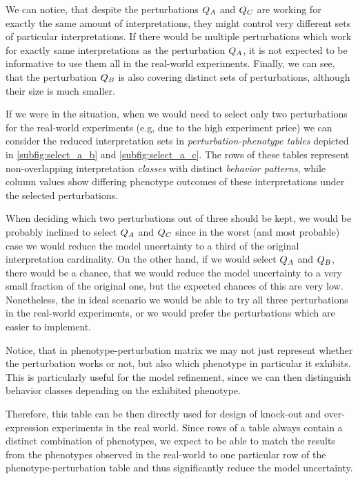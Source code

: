 We can notice, that despite the perturbations $Q_A$ and $Q_C$ are working for exactly the same amount of interpretations, they might control very different sets of particular interpretations. If there would be multiple perturbations which work for exactly same interpretations as the perturbation $Q_A$, it is not expected to be informative to use them all in the real-world experiments. Finally, we can see, that the perturbation $Q_B$ is also covering distinct sets of perturbations, although their size is much smaller. 

If we were in the situation, when we would need to select only two perturbations for the real-world experiments (e.g, due to the high experiment price) we can consider the reduced interpretation sets in \emph{perturbation-phenotype tables} depicted in \autoref{subfig:select_a_b} and \autoref{subfig:select_a_c}. The rows of these tables represent non-overlapping interpretation \emph{classes} with distinct \emph{behavior patterns}, while column values show differing phenotype outcomes of these interpretations under the selected perturbations.

When deciding which two perturbations out of three should be kept, we would be probably inclined to select $Q_A$ and $Q_C$ since in the worst (and most probable) case we would reduce the model uncertainty to a third of the original interpretation cardinality. On the other hand, if we would select $Q_A$ and $Q_B$, there would be a chance, that we would reduce the model uncertainty to a very small fraction of the original one, but the expected chances of this are very low. Nonetheless, the in ideal scenario we would be able to try all three perturbations in the real-world experiments, or we would prefer the perturbations which are easier to implement. 

Notice, that in phenotype-perturbation matrix we may not just represent whether the perturbation works or not, but also which phenotype in particular it exhibits. This is particularly useful for the model refinement, since we can then distinguish behavior classes depending on the exhibited phenotype.

Therefore, this table can be then directly used for design of knock-out and over-expression experiments in the real world. Since rows of a table always contain a distinct combination of phenotypes, we expect to be able to match the results from the phenotypes observed in the real-world to one particular row of the phenotype-perturbation table and thus significantly reduce the model uncertainty.


